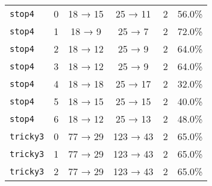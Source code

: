 \begin{tabular}{llcccc}
\texttt{stop4} & 0 & 18 → 15 & 25 → 11 & 2 & 56.0\% \\
\texttt{stop4} & 1 & 18 → 9 & 25 → 7 & 2 & 72.0\% \\
\texttt{stop4} & 2 & 18 → 12 & 25 → 9 & 2 & 64.0\% \\
\texttt{stop4} & 3 & 18 → 12 & 25 → 9 & 2 & 64.0\% \\
\texttt{stop4} & 4 & 18 → 18 & 25 → 17 & 2 & 32.0\% \\
\texttt{stop4} & 5 & 18 → 15 & 25 → 15 & 2 & 40.0\% \\
\texttt{stop4} & 6 & 18 → 12 & 25 → 13 & 2 & 48.0\% \\
\texttt{tricky3} & 0 & 77 → 29 & 123 → 43 & 2 & 65.0\% \\
\texttt{tricky3} & 1 & 77 → 29 & 123 → 43 & 2 & 65.0\% \\
\texttt{tricky3} & 2 & 77 → 29 & 123 → 43 & 2 & 65.0\% \\
\bottomrule
\end{tabular}

